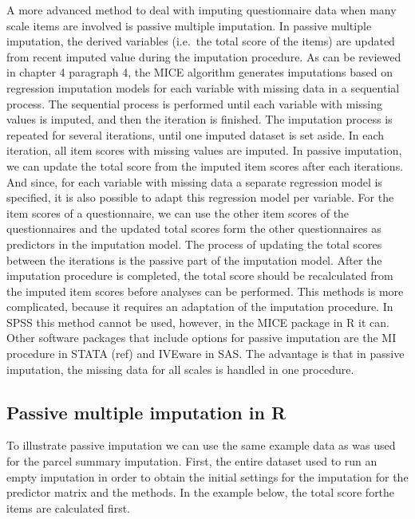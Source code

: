 \documentclass[]{book}
\begin{document}
A more advanced method to deal with imputing questionnaire data when
many scale items are involved is passive multiple imputation. In passive
multiple imputation, the derived variables (i.e.~the total score of the
items) are updated from recent imputed value during the imputation
procedure. As can be reviewed in chapter 4 paragraph 4, the MICE
algorithm generates imputations based on regression imputation models
for each variable with missing data in a sequential process. The
sequential process is performed until each variable with missing values
is imputed, and then the iteration is finished. The imputation process
is repeated for several iterations, until one imputed dataset is set
aside. In each iteration, all item scores with missing values are
imputed. In passive imputation, we can update the total score from the
imputed item scores after each iterations. And since, for each variable
with missing data a separate regression model is specified, it is also
possible to adapt this regression model per variable. For the item
scores of a questionnaire, we can use the other item scores of the
questionnaires and the updated total scores form the other
questionnaires as predictors in the imputation model. The process of
updating the total scores between the iterations is the passive part of
the imputation model. After the imputation procedure is completed, the
total score should be recalculated from the imputed item scores before
analyses can be performed. This methods is more complicated, because it
requires an adaptation of the imputation procedure. In SPSS this method
cannot be used, however, in the MICE package in R it can. Other software
packages that include options for passive imputation are the MI
procedure in STATA (ref) and IVEware in SAS. The advantage is that in
passive imputation, the missing data for all scales is handled in one
procedure.

\subsection{Passive multiple imputation in
R}\label{passive-multiple-imputation-in-r}

To illustrate passive imputation we can use the same example data as was
used for the parcel summary imputation. First, the entire dataset used
to run an empty imputation in order to obtain the initial settings for
the imputation for the predictor matrix and the methods. In the example
below, the total score forthe items are calculated first.
\end{document}
